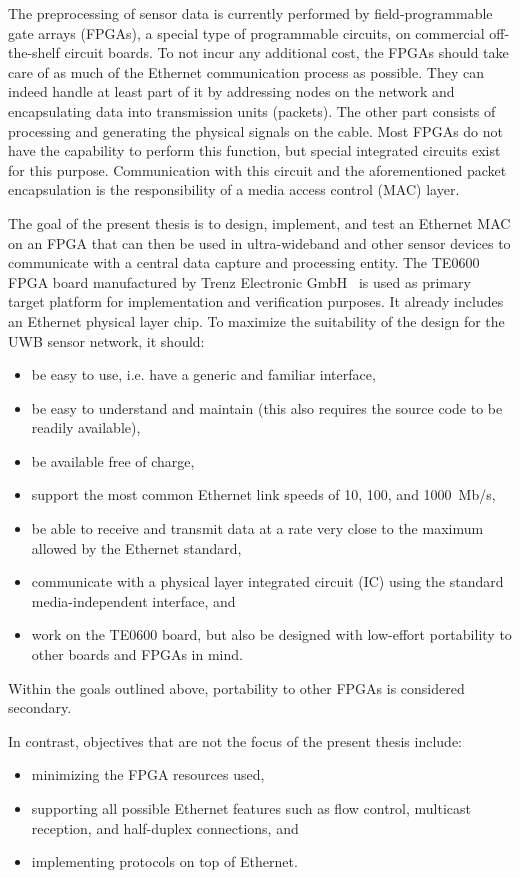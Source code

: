 \documentclass[a4paper, 11pt, oneside]{Thesis}  %
\begin{document}
The preprocessing of sensor data is currently performed by field-programmable gate arrays (FPGAs), a special type of programmable circuits, on commercial off-the-shelf circuit boards. To not incur any additional cost, the FPGAs should take care of as much of the Ethernet communication process as possible. They can indeed handle at least part of it by addressing nodes on the network and encapsulating data into transmission units (packets). The other part consists of processing and generating the physical signals on the cable. Most FPGAs do not have the capability to perform this function, but special integrated circuits exist for this purpose. Communication with this circuit and the aforementioned packet encapsulation is the responsibility of a media access control (MAC) layer.

The goal of the present thesis is to design, implement, and test an Ethernet MAC on an FPGA that can then be used in ultra-wideband and other sensor devices to communicate with a central data capture and processing entity. The TE0600 FPGA board manufactured by Trenz Electronic GmbH~\cite{TE0600Page} is used as primary target platform for implementation and verification purposes. It already includes an Ethernet physical layer chip. To maximize the suitability of the design for the UWB sensor network, it should:
\begin{itemize}
\item be easy to use, i.e. have a generic and familiar interface,
\item be easy to understand and maintain (this also requires the source code to be readily available),
\item be available free of charge,
\item support the most common Ethernet link speeds of 10, 100, and 1000~Mb/s,
\item be able to receive and transmit data at a rate very close to the maximum allowed by the Ethernet standard,
\item communicate with a physical layer integrated circuit (IC) using the standard media-independent interface, and
\item work on the TE0600 board, but also be designed with low-effort portability to other boards and FPGAs in mind.
\end{itemize}
Within the goals outlined above, portability to other FPGAs is considered secondary.

In contrast, objectives that are not the focus of the present thesis include:
\begin{itemize}
\item minimizing the FPGA resources used,
\item supporting all possible Ethernet features such as flow control, multicast reception, and half-duplex connections, and
\item implementing protocols on top of Ethernet. 
\end{itemize}
\end{document}
